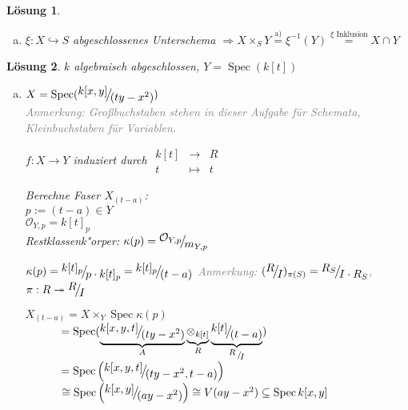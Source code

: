 \documentclass[paper = A4, fontsize=12pt, numbers=noendperiod, chapterprefix=true]{scrbook}
\theoremstyle{break}
\newtheorem{Loes}{L\"osung}
\theoremstyle{nonumberbreak}
\theoremstyle{nonumberplain}
\DeclareMathOperator{\Spec}{Spec}
\newcommand{\calO}{\mathcal{O}}
\newcommand{\X}{\times}
\newcommand{\FakRaum}[2]{
	\raisebox{0.7ex}{\ensuremath{#1}}
	\ensuremath{\mkern-3mu}\big/\ensuremath{\mkern-3mu}
	\raisebox{-0.6ex}{\ensuremath{#2}}}
\begin{document}
\begin{Loes}
\begin{enumerate}[a)]
\begin{center}
\end{center}
	
	$X \X_S Y = \bigcup\limits_{i \in I} X \X_S Y \overset{\text{Vorl.}}{=} \bigcup\limits_{i \in I} X_i \X_{S_i} Y_i \overset{\text{s. o.}}{=} \bigcup\limits_{i\in I} \xi^{-1} (Y_i) = \xi^{-1} (\bigcup\limits_{i\in I} Y_i) = \xi^{-1}(Y)$
\item
	$\xi: X \hookrightarrow S$ abgeschlossenes Unterschema $\Rightarrow X \X_S Y \overset{\text{a)}}{=} \xi^{-1}(Y) \overset{\xi \text{ Inklusion}}{=} X \cap Y$
\end{enumerate}\end{Loes}

\begin{Loes}
$k$ algebraisch abgeschlossen, $Y = \Spec(k[t])$
\begin{enumerate}[a)]
\item
	$X = \Spec (\FakRaum{k[x,y]}{(ty-x^2)})$\\
	\textcolor{gray}{Anmerkung: Gro\ss buchstaben stehen in dieser Aufgabe f\"ur Schemata, Kleinbuchstaben f\"ur Variablen.}
	
	$f: X \to Y$ induziert durch $\begin{array}{ccc} k[t] &\to& R \\ t &\mapsto& t\end{array}$
	
	Berechne Faser $X_{(t-a)}$:\\
	$p:= (t-a) \in Y$\\
	$\calO_{Y,p} = k[t]_p$\\
	Restklassenk"orper: $\kappa(p) = \FakRaum{\calO_{Y,p}}{m_{Y,p}}$
	
	$\kappa(p) = \FakRaum{k[t]_p}{p \cdot k[t]_p} = \FakRaum{k[t]_p}{(t-a)}$ \textcolor{gray}{Anmerkung: $(\FakRaum{R}{I})_{\pi(S)} = \FakRaum{R_S}{I\cdot R_S}$, $\pi: R \twoheadrightarrow \FakRaum{R}{I}$}
	
	$X_{(t-a)} = X \X_Y \Spec \kappa(p)$\\
	$\textcolor{white}{X_{(t-a)}} = \Spec( \underbrace{\FakRaum{k[x,y,t]}{(ty-x^2)}}_{A} \underbrace{\otimes_{k[t]}}_{R} \underbrace{\FakRaum{k[t]}{(t-a)}}_{\scriptsize{\raisebox{0.7ex}{\ensuremath{R}}\ensuremath{\mkern-3mu}\ / \ensuremath{\mkern-3mu}\raisebox{-0.6ex}{\ensuremath{I}}}})$\\
	$\textcolor{white}{X_{(t-a)}} = \Spec\left(\FakRaum{k[x,y,t]}{(ty - x^2, t-a)}\right)$\\
	$\textcolor{white}{X_{(t-a)}} \cong \Spec\left(  \FakRaum{k[x,y]}{(ay-x^2)} \right) \cong V(ay-x^2) \subseteq \Spec k[x,y]$
	

\end{enumerate}
\end{Loes}
\end{document}
